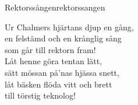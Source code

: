 \begin{song}{Rektorssången}{rektorssangen}
\begin{vers}
Ur Chalmers hjärtans djup en gång,\\
en felstämd och en krånglig sång\\
som går till rektorn fram!   \\
Låt henne göra tentan lätt,\\
sätt mössan på'nas hjässa snett,\\
låt bäsken flöda vitt och brett\\
till törstig teknolog!\\
\end{vers}
\end{song}
